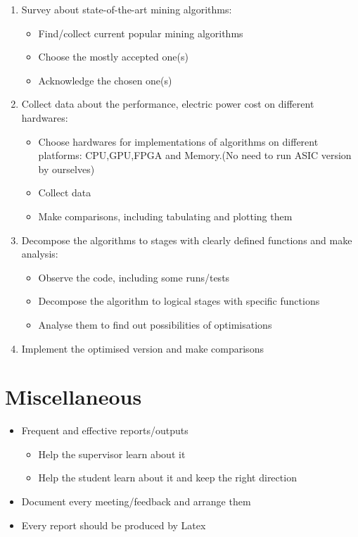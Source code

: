 \documentclass[11pt]{article}
\begin{document}
\begin{enumerate}
\item Survey about state-of-the-art mining algorithms:
	\begin{itemize}
		\item Find/collect current popular mining algorithms
		\item Choose the mostly accepted one(s)
		\item Acknowledge the chosen one(s)
	\end{itemize}
\item Collect data about the performance, electric power cost on different hardwares:
   \begin{itemize}
      \item Choose hardwares for implementations of algorithms on different platforms: CPU,GPU,FPGA and Memory.(No need to run ASIC version by ourselves)
      \item Collect data
      \item Make comparisons, including tabulating and plotting them
   \end{itemize}
\item Decompose the algorithms to stages with clearly defined functions and make analysis:
   \begin{itemize}
      \item Observe the code, including some runs/tests
      \item Decompose the algorithm to logical stages with specific functions
      \item Analyse them to find out possibilities of optimisations
   \end{itemize}
\item Implement the optimised version and make comparisons

\end{enumerate}

%
%
\section{Miscellaneous}

\begin{itemize}
\item Frequent and effective reports/outputs
	\begin{itemize}
      \item Help the supervisor learn about it
      \item Help the student learn about it and keep the right direction
    \end{itemize}
\item Document every meeting/feedback and arrange them
\item Every report should be produced by Latex
\end{itemize}
\end{document}
